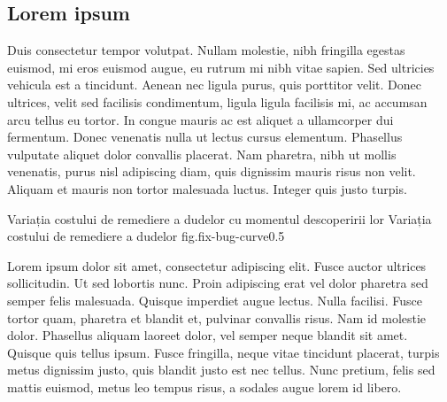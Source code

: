 \subsection{Lorem ipsum}

Duis consectetur tempor volutpat. Nullam molestie, nibh fringilla egestas
euismod, mi eros euismod augue, eu rutrum mi nibh vitae sapien. Sed ultricies
vehicula est a tincidunt. Aenean nec ligula purus, quis porttitor velit. Donec
ultrices, velit sed facilisis condimentum, ligula ligula facilisis mi, ac
accumsan arcu tellus eu tortor. In congue mauris ac est aliquet a ullamcorper
dui fermentum. Donec venenatis nulla ut lectus cursus elementum. Phasellus
vulputate aliquet dolor convallis placerat. Nam pharetra, nibh ut mollis
venenatis, purus nisl adipiscing diam, quis dignissim mauris risus non velit.
Aliquam et mauris non tortor malesuada luctus. Integer quis justo turpis.


%
	{Variația costului de remediere a dudelor cu momentul descoperirii
	lor}%
	{Variația costului de remediere a dudelor}%
	{fig.fix-bug-curve}{0.5}

Lorem ipsum dolor sit amet, consectetur adipiscing elit. Fusce auctor ultrices
sollicitudin. Ut sed lobortis nunc. Proin adipiscing erat vel dolor pharetra
sed semper felis malesuada. Quisque imperdiet augue lectus. Nulla facilisi.
Fusce tortor quam, pharetra et blandit et, pulvinar convallis risus. Nam id
molestie dolor. Phasellus aliquam laoreet dolor, vel semper neque blandit sit
amet. Quisque quis tellus ipsum. Fusce fringilla, neque vitae tincidunt
placerat, turpis metus dignissim justo, quis blandit justo est nec tellus. Nunc
pretium, felis sed mattis euismod, metus leo tempus risus, a sodales augue
lorem id libero.
